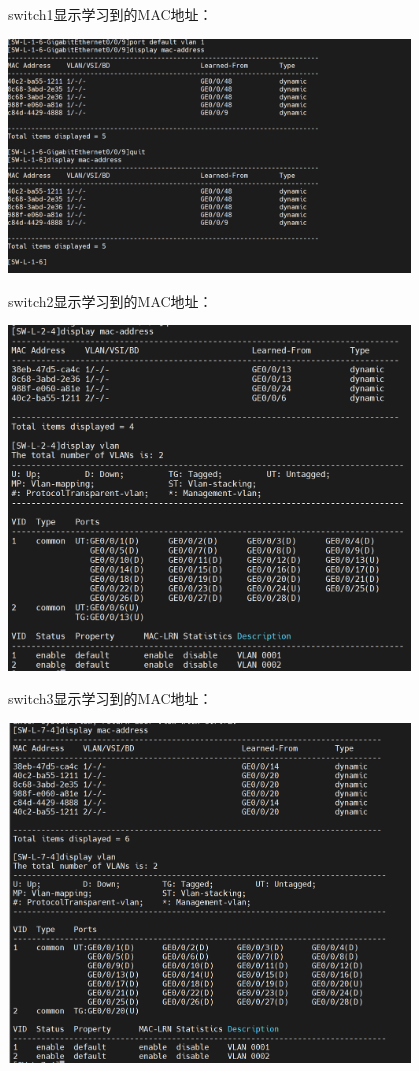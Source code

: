 \documentclass{article}
\begin{document}
switch1显示学习到的MAC地址：

\vspace{10pt}
\centerline{\includegraphics[width=0.8\textwidth]{2_5_images/5.png}}
\vspace{10pt}
switch2显示学习到的MAC地址：

\vspace{10pt}
\centerline{\includegraphics[width=0.8\textwidth]{2_5_images/6.png}}
\vspace{10pt}
switch3显示学习到的MAC地址：

\vspace{10pt}
\centerline{\includegraphics[width=0.8\textwidth]{2_5_images/7.png}}
\vspace{10pt}
\end{document}
